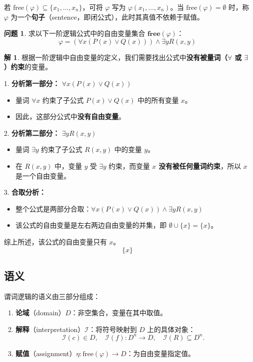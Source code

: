 \documentclass[UTF8,11pt,a4paper]{ctexbook}   %
\theoremstyle{definition}
\newtheorem{problem}{问题}[section]
\newtheorem{solution}{解}[section]
\begin{document}
若 $\mathrm{free}(\varphi)\subseteq\{x_1,\ldots,x_n\}$，可将 $\varphi$ 写为 $\varphi(x_1,\ldots,x_n)$。当 $\mathrm{free}(\varphi)=\emptyset$ 时，称 $\varphi$ 为一个\textbf{句子}（sentence，即闭公式），此时其真值不依赖于赋值。

\begin{problem}
求以下一阶逻辑公式中的自由变量集合 \(\textbf{free}(\varphi)\)：
\[
 \varphi = (\forall x (P(x) \lor Q(x))) \land \exists y R(x, y) 
\]
\end{problem}

\begin{solution}
根据一阶逻辑中自由变量的定义，我们需要找出公式中\textbf{没有被量词（\(\forall\) 或 \(\exists\)）约束}的变量。

1.  \textbf{分析第一部分：} \(\forall x (P(x) \lor Q(x))\)
    \begin{itemize}
        \item 量词 \(\forall x\) 约束了子公式 \(P(x) \lor Q(x)\) 中的所有变量 \(x\)。
        \item 因此，这部分公式中\textbf{没有自由变量}。
    \end{itemize}

2.  \textbf{分析第二部分：} \(\exists y R(x, y)\)
    \begin{itemize}
        \item 量词 \(\exists y\) 约束了子公式 \(R(x, y)\) 中的变量 \(y\)。
        \item 在 \(R(x, y)\) 中，变量 \(y\) 受 \(\exists y\) 约束，而变量 \textbf{\(x\) 没有被任何量词约束}，所以 \(x\) 是一个自由变量。
    \end{itemize}

3.  \textbf{合取分析：}
    \begin{itemize}
        \item 整个公式是两部分合取：\(\forall x (P(x) \lor Q(x)) \land \exists y R(x, y)\)
        \item 该公式的自由变量是左右两边自由变量的并集，即 \(\emptyset \cup \{x\} = \{x\}\)。
    \end{itemize}

综上所述，该公式的自由变量只有 \(x\)。
\[
 \boxed{\{x\}} 
\]
\end{solution}

\subsection{语义}

谓词逻辑的语义由三部分组成：
\begin{enumerate}
    \item \textbf{论域}（domain）$D$：非空集合，变量在其中取值。
    \item \textbf{解释}（interpretation）$\mathcal{I}$：将符号映射到 $D$ 上的具体对象：
    \[
    \mathcal{I}(c)\in D,\quad \mathcal{I}(f):D^n\to D,\quad \mathcal{I}(R)\subseteq D^n.
    \]
    \item \textbf{赋值}（assignment）$\eta:\mathrm{free}(\varphi)\to D$：为自由变量指定值。
\end{enumerate}
\end{document}
